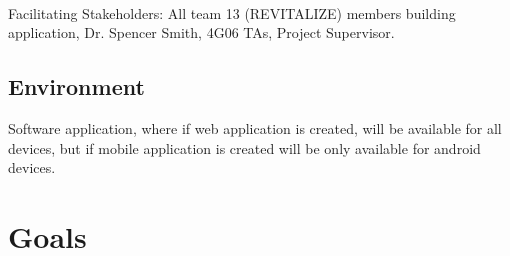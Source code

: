 \documentclass[12pt,letterpaper]{article}
\begin{document}
\noindent
\\
Facilitating Stakeholders: All team 13 (REVITALIZE) members building application, Dr. Spencer Smith, 4G06 TAs, Project Supervisor.

\subsection{Environment}

Software application, where if web application is created, will be available for all devices, but if mobile application is created will be only available for android devices.

\section{Goals}
\end{document}
